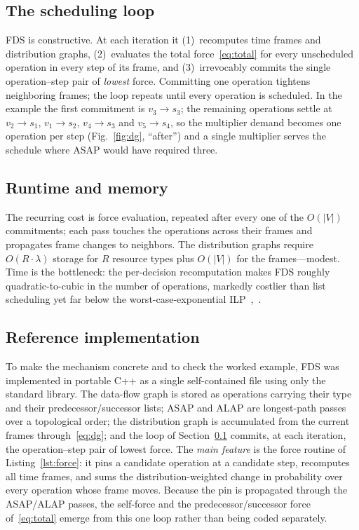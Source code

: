 \documentclass[conference]{IEEEtran}
\begin{document}
\subsection{The scheduling loop}\label{ssec:loop}
FDS is constructive. At each iteration it (1)~recomputes time frames and
distribution graphs, (2)~evaluates the total force~\eqref{eq:total} for every
unscheduled operation in every step of its frame, and (3)~irrevocably commits
the single operation--step pair of \emph{lowest} force. Committing one
operation tightens neighboring frames; the loop repeats until every operation
is scheduled. In the example the first commitment is $v_3\!\to\!s_3$; the
remaining operations settle at $v_2\!\to\!s_1$, $v_1\!\to\!s_2$, $v_4\!\to\!s_3$ and
$v_5\!\to\!s_4$, so the multiplier demand becomes one operation per step
(Fig.~\ref{fig:dg}, ``after'') and a single multiplier serves the schedule where
ASAP would have required three.

\subsection{Runtime and memory}
The recurring cost is force evaluation, repeated after every one of the
$O(|V|)$ commitments; each pass touches the operations across their frames and
propagates frame changes to neighbors. The distribution graphs require
$O(R\cdot\lambda)$ storage for $R$ resource types plus $O(|V|)$ for the
frames---modest. Time is the bottleneck: the per-decision recomputation makes
FDS roughly quadratic-to-cubic in the number of operations, markedly costlier
than list scheduling yet far below the worst-case-exponential
ILP~\cite{b1},~\cite{b2}.

\subsection{Reference implementation}\label{ssec:impl}
To make the mechanism concrete and to check the worked example, FDS was
implemented in portable C++ as a single self-contained file using only the
standard library. The data-flow graph is stored as operations carrying their
type and their predecessor/successor lists; ASAP and ALAP are longest-path
passes over a topological order; the distribution graph is accumulated from the
current frames through~\eqref{eq:dg}; and the loop of
Section~\ref{ssec:loop} commits, at each iteration, the operation--step pair of
lowest force. The \emph{main feature} is the force routine of
Listing~\ref{lst:force}: it pins a candidate operation at a candidate step,
recomputes all time frames, and sums the distribution-weighted change in
probability over every operation whose frame moves. Because the pin is
propagated through the ASAP/ALAP passes, the self-force and the
predecessor/successor force of~\eqref{eq:total} emerge from this one loop rather
than being coded separately.
\end{document}
